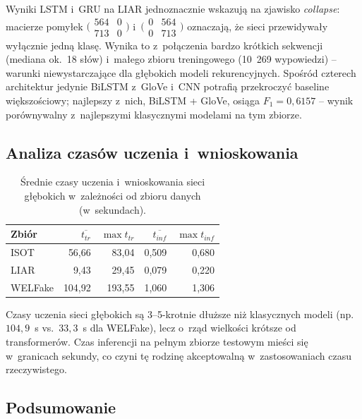 \documentclass[oneside,polski,logo]{amuthesis}
\begin{document}
Wyniki LSTM i~GRU na LIAR jednoznacznie wskazują na zjawisko \textit{collapse}:
macierze pomyłek $\bigl(\begin{smallmatrix}564 & 0\\ 713 & 0\end{smallmatrix}\bigr)$
i~$\bigl(\begin{smallmatrix}0 & 564\\ 0 & 713\end{smallmatrix}\bigr)$
oznaczają, że sieci przewidywały wyłącznie jedną klasę. Wynika to
z~połączenia bardzo krótkich sekwencji (mediana ok.\ 18 słów) i~małego
zbioru treningowego (10~269 wypowiedzi) -- warunki niewystarczające dla
głębokich modeli rekurencyjnych. Spośród czterech architektur jedynie
BiLSTM z~GloVe i~CNN potrafią przekroczyć baseline większościowy; najlepszy
z~nich, BiLSTM + GloVe, osiąga \(F_1 = 0{,}6157\) -- wynik porównywalny
z~najlepszymi klasycznymi modelami na tym zbiorze.

\subsection{Analiza czasów uczenia i~wnioskowania}
\label{sec:wyniki_glebokie_czas}

\begin{table}[ht]
\centering
\caption{Średnie czasy uczenia i~wnioskowania sieci głębokich
w~zależności od zbioru danych (w~sekundach).}
\label{tab:dl_czasy}
\begin{tabular}{lrrrr}
\toprule
Zbiór & $\overline{t_{tr}}$ & $\max{t_{tr}}$ & $\overline{t_{inf}}$ & $\max{t_{inf}}$ \\
\midrule
ISOT    & 56,66  & 83,04  & 0,509 & 0,680 \\
LIAR    & 9,43   & 29,45  & 0,079 & 0,220 \\
WELFake & 104,92 & 193,55 & 1,060 & 1,306 \\
\bottomrule
\end{tabular}
\end{table}

Czasy uczenia sieci głębokich są 3--5-krotnie dłuższe niż klasycznych
modeli (np.\ \(104{,}9\)~s vs.\ \(33{,}3\)~s dla WELFake), lecz o~rząd
wielkości krótsze od transformerów. Czas inferencji na pełnym zbiorze
testowym mieści się w~granicach sekundy, co czyni tę rodzinę akceptowalną
w~zastosowaniach czasu rzeczywistego.

\subsection{Podsumowanie}
\label{sec:wyniki_glebokie_podsum}
\end{document}
